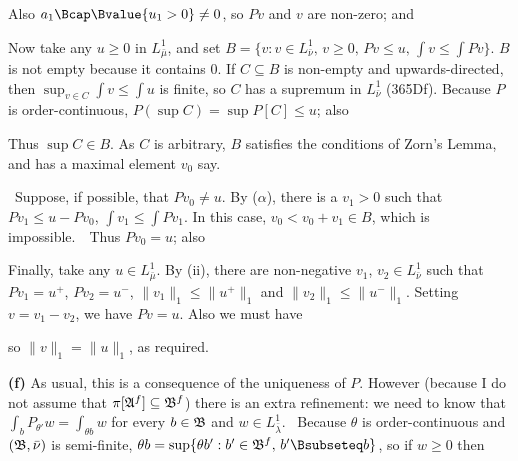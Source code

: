 {
     
\noindent Also $a_1\Bcap\Bvalue{u_1>0}\ne 0$, so $Pv$ and $v$ are
non-zero;  and
     
     
\medskip
     
 Now take any $u\ge 0$ in $L^1_{\bar\mu}$, and set
$B=\{v:v\in L^1_{\bar\nu},\,v\ge 0,\,Pv\le u,\,\int v\le\int Pv\}$.
$B$ is not empty because it contains $0$.
If $C\subseteq B$ is non-empty and upwards-directed, then
$\sup_{v\in C}\int v\le\int u$ is finite, so $C$ has a supremum in
$L^1_{\bar\nu}$ (365Df).   Because $P$ is order-continuous,
$P(\sup C)=\sup P[C]\le u$;  also
     
     
\noindent Thus $\sup C\in B$.   As $C$ is arbitrary, $B$ satisfies the
conditions of Zorn's Lemma, and has a maximal element $v_0$ say.
     
\Quer\ Suppose, if possible, that $Pv_0\ne u$.   By ($\alpha$),
there is a $v_1>0$ such that $Pv_1\le u-Pv_0$, $\int v_1\le\int Pv_1$.
In this case,
$v_0<v_0+v_1\in B$, which is impossible.\ \Bang\ Thus
$Pv_0=u$;  also
     
     
\medskip
     
 Finally, take any $u\in L^1_{\bar\mu}$.   By (ii),
there are non-negative $v_1$, $v_2\in L^1_{\bar\nu}$ such that
$Pv_1=u^+$,
$Pv_2=u^-$, $\|v_1\|_1\le\|u^+\|_1$ and $\|v_2\|_1\le\|u^-\|_1$.
Setting $v=v_1-v_2$, we have $Pv=u$.   Also we must have
     
     
\noindent so $\|v\|_1=\|u\|_1$, as required.
     
\medskip
     
{\bf (f)} As usual, this is a consequence of the
uniqueness of $P$.   However (because I do not assume that
$\pi[\frak A^f]\subseteq\frak B^f$) there is an extra refinement:  we
need to know
that $\int_bP_{\theta'}w=\int_{\theta b}w$ for every $b\in\frak B$ and
$w\in L^1_{\bar\lambda}$.   \Prf\ Because $\theta$ is order-continuous
and $(\frak B,\bar\nu)$ is semi-finite,
$\theta b=\sup\{\theta b':b'\in\frak B^f,\,b'\Bsubseteq b\}$, so if
$w\ge 0$ then
     
}
